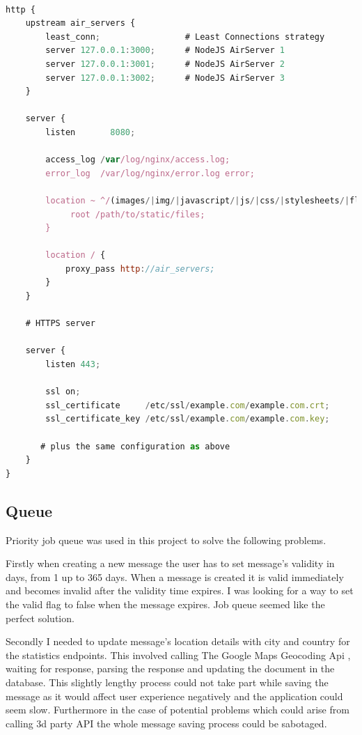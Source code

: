 \documentclass[thesis=M,english]{FITthesis}[2012/10/20]
\begin{document}
\begin{lstlisting}[language=JavaScript]

http {
    upstream air_servers {
        least_conn;                 # Least Connections strategy
        server 127.0.0.1:3000;      # NodeJS AirServer 1
        server 127.0.0.1:3001;      # NodeJS AirServer 2
        server 127.0.0.1:3002;      # NodeJS AirServer 3
    }

    server {
        listen       8080;
        
        access_log /var/log/nginx/access.log;
        error_log  /var/log/nginx/error.log error;

        location ~ ^/(images/|img/|javascript/|js/|css/|stylesheets/|flash/|media/|static/|robots.txt|humans.txt|favicon.ico) {
             root /path/to/static/files;
        }        

        location / {
            proxy_pass http://air_servers;
        }
    }

    # HTTPS server
    
    server {
        listen 443;
        
        ssl on;
        ssl_certificate     /etc/ssl/example.com/example.com.crt;
        ssl_certificate_key /etc/ssl/example.com/example.com.key;

       # plus the same configuration as above
    }
}


\end{lstlisting}


\subsection{Queue}

Priority job queue was used in this project to solve the following problems. 

Firstly when creating a new message the user has to set message's validity in days, from 1 up to 365 days. When a message is created it is valid immediately and becomes invalid after the validity time expires. I was looking for a way to set the valid flag to false when the message expires. Job queue seemed like the perfect solution. 

Secondly I needed to update message's location details with city and country for the statistics endpoints. This involved calling The Google Maps Geocoding Api \cite{maps-api}, waiting for response, parsing the response and updating the document in the database. This slightly lengthy process could not take part while saving the message as it would affect user experience negatively and the application could seem slow. Furthermore in the case of potential problems which could arise from calling 3d party API the whole message saving process could be sabotaged.
\end{document}
